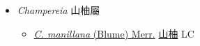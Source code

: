 
  \begin{itemize}
 \item[] \textit{Champereia} 山柚屬
                    
  \begin{itemize}
        \item[] \href{http://www.theplantlist.org/tpl1.1/search?q=Champereia+manillana}{\textit{C. manillana} (Blume) Merr.}   \href{\detokenize{http://taibnet.sinica.edu.tw/chi/taibnet_species_list.php?T2=山柚&T2_new_value=true&fr=y}}{山柚} LC
  \end{itemize}
  \end{itemize}
